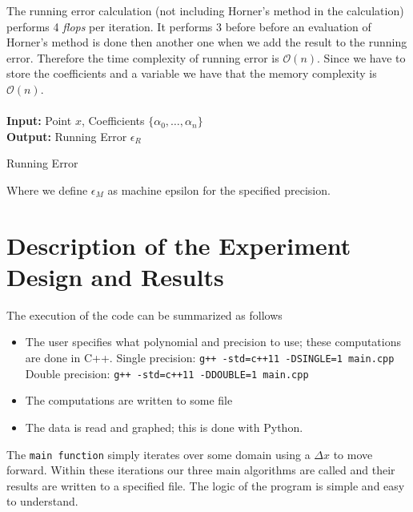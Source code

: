 \documentclass[12pt]{article}
\DeclarePairedDelimiter \abs{\lvert}{\rvert}%
\theoremstyle{remark}
\begin{document}
The running error calculation (not including Horner's method in the calculation) performs 4 \textit{flops} per iteration. It performs 3 before before an evaluation of Horner's method is done then another one when we add the result to the running error. Therefore the time complexity of running error is $\mathcal{O}(n)$. Since we have to store the coefficients and a variable we have that the memory complexity is $\mathcal{O}(n)$. \\ \\
\textbf{Input:} Point $x$, Coefficients $\{\alpha_0,\ldots,\alpha_n\}$ \\
\textbf{Output:} Running Error $\epsilon_R$
\vspace{-0.3cm}
\begin{algorithm}[H]
	\caption{Running Error}
	\begin{algorithmic}[1]
		\EndFor
	\end{algorithmic}
\end{algorithm}
\vspace{-0.65cm}
{\scriptsize Where we define $\epsilon_M$ as machine epsilon for the specified precision.} 

\section{Description of the Experiment Design and Results}

The execution of the code can be summarized as follows
\begin{itemize}
	\item The user specifies what polynomial and precision to use; these computations are done in C++.
	\subitem Single precision: \texttt{g++ -std=c++11 -DSINGLE=1 main.cpp}
	\subitem Double precision: \texttt{g++ -std=c++11 -DDOUBLE=1 main.cpp}
	\item The computations are written to some file
	\item The data is read and graphed; this is done with Python.
\end{itemize}	
The \texttt{main function} simply iterates over some domain using a $\Delta x$ to move forward. Within these iterations our three main algorithms are called and their results are written to a specified file. The logic of the program is simple and easy to understand.
\end{document}
